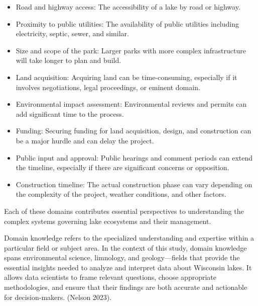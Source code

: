 \documentclass[
]{article}
\providecommand{\tightlist}{%
  \setlength{\itemsep}{0pt}\setlength{\parskip}{0pt}}\usepackage{longtable,booktabs,array}
\begin{document}
\begin{itemize}
\tightlist
\item
  Road and highway access: The accessibility of a lake by road or
  highway.
\item
  Proximity to public utilities: The availability of public utilities
  including electricity, septic, sewer, and similar.
\item
  Size and scope of the park: Larger parks with more complex
  infrastructure will take longer to plan and build.
\item
  Land acquisition: Acquiring land can be time-consuming, especially if
  it involves negotiations, legal proceedings, or eminent domain.
\item
  Environmental impact assessment: Environmental reviews and permits can
  add significant time to the process.
\item
  Funding: Securing funding for land acquisition, design, and
  construction can be a major hurdle and can delay the project.
\item
  Public input and approval: Public hearings and comment periods can
  extend the timeline, especially if there are significant concerns or
  opposition.
\item
  Construction timeline: The actual construction phase can vary
  depending on the complexity of the project, weather conditions, and
  other factors.
\end{itemize}

Each of these domains contributes essential perspectives to
understanding the complex systems governing lake ecosystems and their
management.

\begin{tcolorbox}[enhanced jigsaw, coltitle=black, toprule=.15mm, arc=.35mm, bottomtitle=1mm, opacityback=0, leftrule=.75mm, left=2mm, colframe=quarto-callout-note-color-frame, toptitle=1mm, titlerule=0mm, breakable, colbacktitle=quarto-callout-note-color!10!white, colback=white, bottomrule=.15mm, title=\textcolor{quarto-callout-note-color}{\faInfo}\hspace{0.5em}{Note}, rightrule=.15mm, opacitybacktitle=0.6]

Domain knowledge refers to the specialized understanding and expertise
within a particular field or subject area. In the context of this study,
domain knowledge spans environmental science, limnology, and
geology---fields that provide the essential insights needed to analyze
and interpret data about Wisconsin lakes. It allows data scientists to
frame relevant questions, choose appropriate methodologies, and ensure
that their findings are both accurate and actionable for
decision-makers. (Nelson 2023).

\end{tcolorbox}
\end{document}
